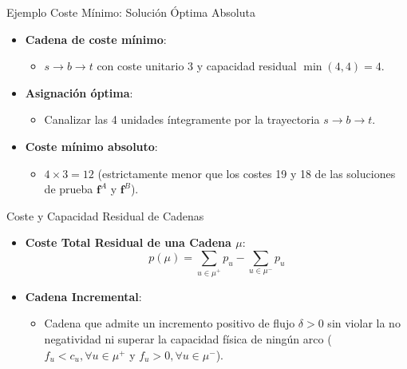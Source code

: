 \documentclass[
  ignorenonframetext,
]{beamer}
\providecommand{\tightlist}{%
  \setlength{\itemsep}{0pt}\setlength{\parskip}{0pt}}
\begin{document}
\begin{frame}{Ejemplo Coste Mínimo: Solución Óptima Absoluta}
\label{ejemplo-coste-muxednimo-soluciuxf3n-uxf3ptima-absoluta}
\begin{itemize}
\tightlist
\item
  \textbf{Cadena de coste mínimo}:

  \begin{itemize}
  \tightlist
  \item
    \(s \to b \to t\) con coste unitario 3 y capacidad residual
    \(\min(4, 4) = 4\).
  \end{itemize}
\item
  \textbf{Asignación óptima}:

  \begin{itemize}
  \tightlist
  \item
    Canalizar las 4 unidades íntegramente por la trayectoria
    \(s \to b \to t\).
  \end{itemize}
\item
  \textbf{Coste mínimo absoluto}:

  \begin{itemize}
  \tightlist
  \item
    \(4 \times 3 = 12\) (estrictamente menor que los costes 19 y 18 de
    las soluciones de prueba \(\mathbf{f}^A\) y \(\mathbf{f}^B\)).
  \end{itemize}
\end{itemize}
\end{frame}

\begin{frame}{Coste y Capacidad Residual de Cadenas}
\label{coste-y-capacidad-residual-de-cadenas}
\begin{itemize}
\item
  \textbf{Coste Total Residual de una Cadena \(\mu\)}:
  \[p(\mu) = \sum_{u \in \mu^+} p_u - \sum_{u \in \mu^-} p_u\]
\item
  \textbf{Cadena Incremental}:

  \begin{itemize}
  \tightlist
  \item
    Cadena que admite un incremento positivo de flujo \(\delta > 0\) sin
    violar la no negatividad ni superar la capacidad física de ningún
    arco (\(f_u < c_u, \forall u \in \mu^+\) y
    \(f_u > 0, \forall u \in \mu^-\)).
  \end{itemize}
\end{itemize}
\end{frame}
\end{document}
